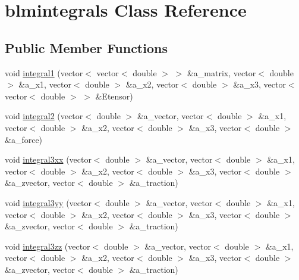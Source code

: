 \hypertarget{classblmintegrals}{
\section{blmintegrals Class Reference}
\label{classblmintegrals}
}
\subsection*{Public Member Functions}
\begin{DoxyCompactItemize}
\item 
void \hyperlink{classblmintegrals_a6bce8d9042569ae61748953a275309b5}{integral1} (vector$<$ vector$<$ double $>$ $>$ \&a\_\-matrix, vector$<$ double $>$ \&a\_\-x1, vector$<$ double $>$ \&a\_\-x2, vector$<$ double $>$ \&a\_\-x3, vector$<$ vector$<$ double $>$ $>$ \&Etensor)
\item 
void \hyperlink{classblmintegrals_aa27da27cf77c5d936633c66d1813ad8d}{integral2} (vector$<$ double $>$ \&a\_\-vector, vector$<$ double $>$ \&a\_\-x1, vector$<$ double $>$ \&a\_\-x2, vector$<$ double $>$ \&a\_\-x3, vector$<$ double $>$ \&a\_\-force)
\item 
void \hyperlink{classblmintegrals_a776e27864b68961f17e93d4465df9e75}{integral3xx} (vector$<$ double $>$ \&a\_\-vector, vector$<$ double $>$ \&a\_\-x1, vector$<$ double $>$ \&a\_\-x2, vector$<$ double $>$ \&a\_\-x3, vector$<$ double $>$ \&a\_\-zvector, vector$<$ double $>$ \&a\_\-traction)
\item 
void \hyperlink{classblmintegrals_a4ad8f34c8a9cf0f1f05dc385a5ee985a}{integral3yy} (vector$<$ double $>$ \&a\_\-vector, vector$<$ double $>$ \&a\_\-x1, vector$<$ double $>$ \&a\_\-x2, vector$<$ double $>$ \&a\_\-x3, vector$<$ double $>$ \&a\_\-zvector, vector$<$ double $>$ \&a\_\-traction)
\item 
void \hyperlink{classblmintegrals_aaa8101a80b5b739666cd601565ec4105}{integral3zz} (vector$<$ double $>$ \&a\_\-vector, vector$<$ double $>$ \&a\_\-x1, vector$<$ double $>$ \&a\_\-x2, vector$<$ double $>$ \&a\_\-x3, vector$<$ double $>$ \&a\_\-zvector, vector$<$ double $>$ \&a\_\-traction)
\end{DoxyCompactItemize}



